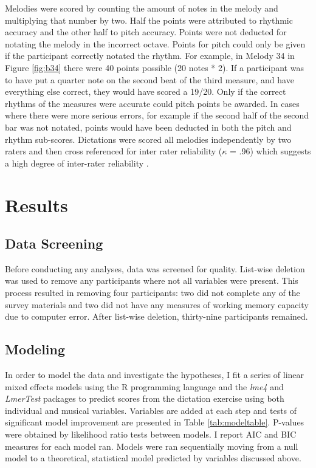 \documentclass[12pt,]{book}
\begin{document}
Melodies were scored by counting the amount of notes in the melody and multiplying that number by two.
Half the points were attributed to rhythmic accuracy and the other
half to pitch accuracy.
Points were not deducted for notating the melody in the incorrect octave.
Points for pitch could only be given if the participant correctly notated the rhythm.
For example, in Melody 34 in Figure \ref{fig:b34} there were 40 points possible (20 notes * 2).
If a participant was to have put a quarter note on the second beat of the third measure, and have everything else correct, they would have scored a 19/20.
Only if the correct rhythms of the measures were accurate could pitch points be
awarded.
In cases where there were more serious errors, for example if the second half of the second bar was not notated, points would have been deducted in both the pitch and rhythm sub-scores.
Dictations were scored all melodies independently by two raters and then cross referenced for inter rater reliability (\(\kappa\) = .96) which suggests a high degree of inter-rater reliability \citep{kooGuidelineSelectingReporting2016}.

\hypertarget{results-1}{%
\section{Results}\label{results-1}}

\hypertarget{data-screening}{%
\subsection{Data Screening}\label{data-screening}}

Before conducting any analyses, data was screened for quality.
List-wise deletion was used to remove any participants where not all variables were present.
This process resulted in removing four participants: two did not complete any of the survey materials and two did not have any measures of working memory capacity due to computer error.
After list-wise deletion, thirty-nine participants remained.

\hypertarget{modeling-1}{%
\subsection{Modeling}\label{modeling-1}}

In order to model the data and investigate the hypotheses, I fit a series of linear mixed effects models using the R programming language \citep{R-base} and the \emph{lme4} and \emph{LmerTest} \citep{batesFittingLinearMixedEffects2015, lmerTest} packages to predict scores from the dictation exercise using both individual and musical variables.
Variables are added at each step and tests of significant model improvement are presented in Table \ref{tab:modeltable}.
P-values were obtained by likelihood ratio tests between models.
I report AIC and BIC measures for each model ran.
Models were ran sequentially moving from a null model to a theoretical, statistical model predicted by variables discussed above.
\end{document}
